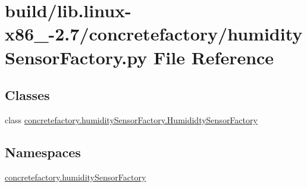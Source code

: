 \hypertarget{build_2lib_8linux-x86__64-2_87_2concretefactory_2humiditySensorFactory_8py}{}\section{build/lib.linux-\/x86\+\_-\/2.7/concretefactory/humidity\+Sensor\+Factory.py File Reference}
\label{build_2lib_8linux-x86__64-2_87_2concretefactory_2humiditySensorFactory_8py}
\subsection*{Classes}
\begin{DoxyCompactItemize}
\item 
class \hyperlink{classconcretefactory_1_1humiditySensorFactory_1_1HumididtySensorFactory}{concretefactory.\+humidity\+Sensor\+Factory.\+Humididty\+Sensor\+Factory}
\end{DoxyCompactItemize}
\subsection*{Namespaces}
\begin{DoxyCompactItemize}
\item 
 \hyperlink{namespaceconcretefactory_1_1humiditySensorFactory}{concretefactory.\+humidity\+Sensor\+Factory}
\end{DoxyCompactItemize}
